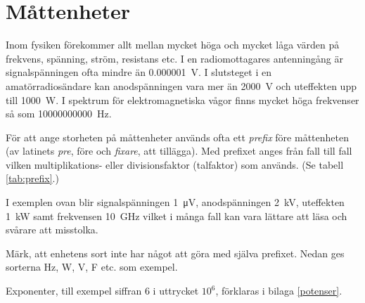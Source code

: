 \chapter{Måttenheter}

\noindent  Inom fysiken förekommer allt mellan mycket höga och mycket låga
  värden på frekvens, spänning, ström, resistans etc.
  I en radiomottagares antenningång är signalspänningen ofta mindre än
  \SI{0,000001}{\volt}.
  I slutsteget i en amatörradiosändare kan anodspänningen vara mer än
  \SI{2000}{\volt} och uteffekten upp till \SI{1000}{\watt}.
  I spektrum för elektromagnetiska vågor finns mycket höga frekvenser
  så som \SI{10000000000}{\hertz}.

  För att ange storheten på måttenheter används ofta ett \emph{prefix} före
  måttenheten (av latinets \emph{pre}, före och \emph{fixare}, att tillägga).
  Med prefixet anges från fall till fall vilken multiplikations- eller
  divisionsfaktor (talfaktor) som används. (Se tabell \ref{tab:prefix}.)

  I exemplen ovan blir signalspänningen \SI{1}{\micro\volt}, anodspänningen
  \SI{2}{\kilo\volt}, uteffekten \SI{1}{\kilo\watt} samt frekvensen
  \SI{10}{\giga\hertz} vilket i många fall kan vara lättare att läsa och svårare
  att misstolka.

  Märk, att enhetens sort inte har något att göra med själva prefixet.
  Nedan ges sorterna Hz, W, V, F etc. som exempel.

  Exponenter, till exempel siffran 6 i uttrycket \(10^6\), förklaras i
  bilaga \ref{potenser}.

